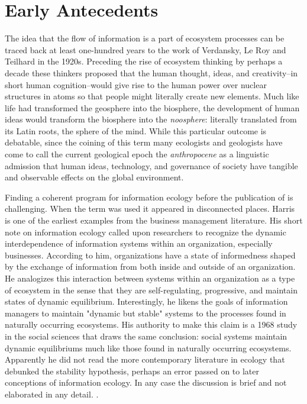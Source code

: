 \section{Early Antecedents}

The idea that the flow of information is a part of ecosystem processes can be traced back at least one-hundred years to the work of Verdansky, Le Roy and Teilhard in the 1920s. Preceding the rise of ecosystem thinking by perhaps a decade these thinkers proposed that the human thought, ideas, and creativity--in short human cognition--would give rise to the human power over nuclear structures in atoms so that people might literally create new elements. Much like life had transformed the geosphere into the biosphere, the development of human ideas would transform the biosphere into the \textit{noosphere}: literally translated from its Latin roots, the sphere of the mind. While this particular outcome is debatable, since the coining of this term many ecologists and geologists have come to call the current geological epoch the \textit{anthropocene} as a linguistic admission that human ideas, technology, and governance of society have tangible and observable effects on the global environment. 

Finding a coherent program for information ecology before the publication of \citep{nardi_information_1999, davenport_information_1997} is challenging. When the term was used it appeared in disconnected places. Harris is one of the earliest examples from the business management literature. His short note on information ecology called upon researchers to recognize the dynamic interdependence of information systems within an organization, especially businesses. According to him, organizations have a state of informedness shaped by the exchange of information from both inside and outside of an organization. He analogizes this interaction between systems within an organization as a type of ecosystem in the sense that they are self-regulating, progressive, and maintain states of dynamic equilibrium. Interestingly, he likens the goals of information managers to maintain "dynamic but stable" systems to the processes found in naturally occurring ecosystems. His authority to make this claim is a 1968 study in the social sciences that draws the same conclusion: social systems maintain dynamic equilibriums much like those found in naturally occurring ecosystems. Apparently he did not read the more contemporary literature in ecology that debunked the stability hypothesis, perhaps an error passed on to later conceptions of information ecology. In any case the discussion is brief and not elaborated in any detail. \citep{harris_information_1989}.

